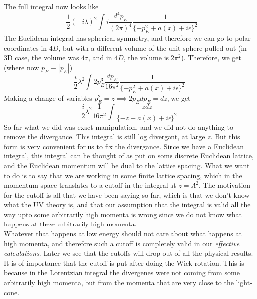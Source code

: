 \documentclass[11pt]{article}
\numberwithin{equation}{section}
\begin{document}
The full integral now looks like 
\begin{equation*}
    -\frac{1}{2}(-i\lambda)^2  \int i\frac{d^4p_{E}}{(2\pi)^4} \frac{1}{\{-p_E^2 + a(x) + i\epsilon\}^2}
\end{equation*}
The Euclidean integral has spherical symmetry, and therefore we can go to polar coordinates in \(4D\), but with a different volume of the unit sphere pulled out (in 3D case, the volume was \(4\pi\), and in \(4D\), the volume is \(2\pi^2\)). Therefore, we get (where now \(p_E\equiv |p_E|\))
\begin{equation*}
    \frac{i}{2}\lambda^2  \int 2 p_E^3 \frac{dp_{E}}{16 \pi^2} \frac{1}{\{-p_E^2 + a(x) + i\epsilon\}^2}
\end{equation*}
Making a change of variables \(p_E^2 = z \implies 2p_Edp_E = dz\), we get 
\begin{equation*}
    \frac{i}{2}\lambda^2  \frac{1}{16\pi^2}\int  \frac{z dz}{\{-z + a(x) + i\epsilon\}^2}
\end{equation*}
So far what we did was exact manipulation, and we did not do anything to remove the divergance. This integral is still log divergant, at large \(z\). But this form is very convenient for us to fix the divergance. Since we have a Euclidean integral, this integral can be thought of as put on some discrete Euclidean lattice, and the Euclidean momentum will be dual to the lattice spacing. What we want to do is to say that we are working in some finite lattice spacing, which in the momentum space translates to a cutoff in the integral at \(z = \Lambda^2\). The motivation for the cutoff is all that we have been saying so far, which is that we don't know what the UV theory is, and that our assumption that the integral is valid all the way upto some arbitrarily high momenta is wrong since we do not know what happens at these arbitrarily high momenta. \\
Whatever that happens at low energy should not care about what happens at high momenta, and therefore such a cutoff is completely valid in our \textit{effective calculations}. Later we see that the cutoffs will drop out of all the physical results. \\

It is of importance that the cutoff is put after doing the Wick rotation. This is because in the Lorentzian integral the divergenes were not coming from some arbitrarily high momenta, but from the momenta that are very close to the light-cone. \\
\end{document}
